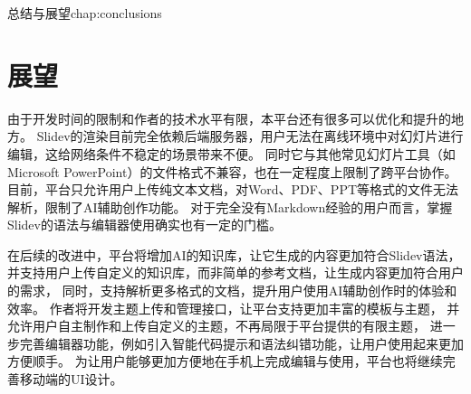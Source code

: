 \begin{cuzchapter}{总结与展望}{chap:conclusions}
	\section{展望}\label{sec:future-work}
	由于开发时间的限制和作者的技术水平有限，本平台还有很多可以优化和提升的地方。
	Slidev的渲染目前完全依赖后端服务器，用户无法在离线环境中对幻灯片进行编辑，这给网络条件不稳定的场景带来不便。
	同时它与其他常见幻灯片工具（如Microsoft PowerPoint）的文件格式不兼容，也在一定程度上限制了跨平台协作。
	目前，平台只允许用户上传纯文本文档，对Word、PDF、PPT等格式的文件无法解析，限制了AI辅助创作功能。
	对于完全没有Markdown经验的用户而言，掌握Slidev的语法与编辑器使用确实也有一定的门槛。

	在后续的改进中，平台将增加AI的知识库，让它生成的内容更加符合Slidev语法，
	并支持用户上传自定义的知识库，而非简单的参考文档，让生成内容更加符合用户的需求，
	同时，支持解析更多格式的文档，提升用户使用AI辅助创作时的体验和效率。
	作者将开发主题上传和管理接口，让平台支持更加丰富的模板与主题，
	并允许用户自主制作和上传自定义的主题，不再局限于平台提供的有限主题，
	进一步完善编辑器功能，例如引入智能代码提示和语法纠错功能，让用户使用起来更加方便顺手。
	为让用户能够更加方便地在手机上完成编辑与使用，平台也将继续完善移动端的UI设计。
	




\end{cuzchapter}

